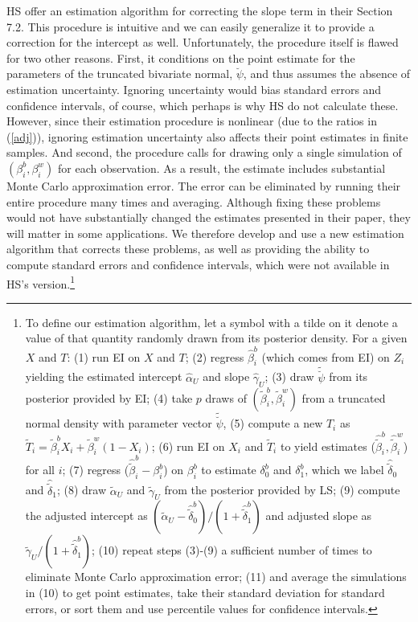 \documentclass[11pt,titlepage]{article}
\newcommand{\psiu}{\breve{\psi}}
\begin{document}
HS offer an estimation algorithm for correcting the slope term in
their Section 7.2.  This procedure is intuitive and we can easily
generalize it to provide a correction for the intercept as well.
Unfortunately, the procedure itself is flawed for two other reasons.
First, it conditions on the point estimate for the parameters of the
truncated bivariate normal, $\breve\psi$, and thus assumes the absence
of estimation uncertainty.  Ignoring uncertainty would bias standard
errors and confidence intervals, of course, which perhaps is why HS do
not calculate these.  However, since their estimation procedure is
nonlinear (due to the ratios in (\ref{adj})), ignoring estimation
uncertainty also affects their point estimates in finite samples.  And
second, the procedure calls for drawing only a single simulation of
$(\beta_i^b,\beta_i^w)$ for each observation.  As a result, the
estimate includes substantial Monte Carlo approximation error.  The
error can be eliminated by running their entire procedure many times
and averaging.  Although fixing these problems would not have
substantially changed the estimates presented in their paper, they
will matter in some applications.  We therefore develop and use a new
estimation algorithm that corrects these problems, as well as
providing the ability to compute standard errors and confidence
intervals, which were not available in HS's version.\footnote{To
  define our estimation algorithm, let a symbol with a tilde on it
  denote a value of that quantity randomly drawn from its posterior
  density.  For a given $X$ and $T$: (1) run EI on $X$ and $T$; (2)
  regress $\hat\beta_i^b$ (which comes from EI) on $Z_i$ yielding the
  estimated intercept $\hat\alpha_U$ and slope $\hat\gamma_U$; (3)
  draw $\tilde\psiu$ from its posterior provided by EI; (4) take $p$
  draws of $(\tilde\beta_i^b,\tilde\beta_i^w)$ from a truncated normal
  density with parameter vector $\tilde\psiu$, (5) compute a new $T_i$
  as $\tilde T_i=\tilde\beta_i^bX_i+\tilde\beta_i^w(1-X_i)$; (6) run
  EI on $X_i$ and $\tilde T_i$ to yield estimates
  ($\hat{\tilde\beta}_i^b,\hat{\tilde\beta}_i^w$) for all $i$; (7) regress
  ($\hat{\tilde\beta}_i^b-\beta_i^b$) on $\beta_i^b$ to estimate
  $\delta_0^b$ and $\delta_1^b$, which we label $\hat{\tilde\delta}_0$
  and $\hat{\tilde\delta}_1$; (8) draw $\tilde\alpha_U$ and
  $\tilde\gamma_U$ from the posterior provided by LS; (9) compute the
  adjusted intercept as
  $(\tilde\alpha_U-\hat{\tilde\delta}_0^b)/(1+\hat{\tilde\delta}_1^b)$ and
  adjusted slope as $\tilde\gamma_U/(1+\hat{\tilde\delta}_1^b)$; (10)
  repeat steps (3)-(9) a sufficient number of times to eliminate Monte
  Carlo approximation error; (11) and average the simulations in (10)
  to get point estimates, take their standard deviation for standard
  errors, or sort them and use percentile values for confidence
  intervals.}
\end{document}
